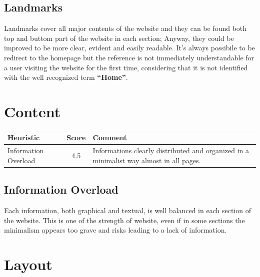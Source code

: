 \subsection{Landmarks}
Landmarks cover all major contents of the website and they can be found both top and buttom part of the website in each section; Anyway, they could be improved to be more clear, evident and easily readable. It’s always possibile to be redirect to the homepage but the reference is not immediately understandable for a user visiting the website for the first time, considering that it is not identified with the well recognized term \textbf{“Home”}.


\section{Content}
\begin{table}[H]
  \begin{center}
    \label{tab:table1}
    \begin{tabular}{||l|c|p{8cm}||} %
      \textbf{Heuristic} & \textbf{Score} & \textbf{Comment}\\
      
      \hline
     Information Overload & 4.5 & Informations clearly distributed and organized in a minimalist way almost in all pages.\\
     
    \end{tabular}
  \end{center}
\end{table}
\subsection{Information Overload}
Each information, both graphical and textual, is well balanced in each section of the website. This is one of the strength of website, even if in some sections the minimalism appears too grave and risks leading to a lack of information.

\section{Layout}
\label{Layout}


